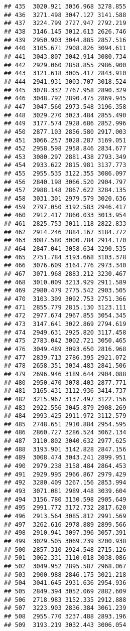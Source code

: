 \documentclass[
]{article}
\begin{document}
\begin{verbatim}
## 435  3020.921 3036.968 3278.855
## 436  3271.498 3047.127 3141.588
## 437  3224.799 2727.947 2792.219
## 438  3146.145 3012.613 2626.746
## 439  2950.903 3044.885 2857.516
## 440  3105.671 2908.826 3094.611
## 441  3043.807 3042.914 3080.734
## 442  2929.060 2858.855 2986.900
## 443  3121.618 3005.417 2843.910
## 444  2941.931 3003.707 3018.524
## 445  3078.332 2767.958 2890.329
## 446  3048.792 2890.475 2869.945
## 447  3047.560 2973.548 3196.358
## 448  3029.270 3023.484 2855.490
## 449  3177.574 2928.686 2852.996
## 450  2877.103 2856.580 2917.003
## 451  3066.257 3028.287 3169.051
## 452  2958.598 2958.846 2834.677
## 453  3080.297 2881.438 2793.349
## 454  2933.622 2815.981 3137.773
## 455  2955.535 3122.355 3086.097
## 456  2840.198 3066.520 2904.797
## 457  2988.148 2867.622 3284.135
## 458  3031.301 2979.579 3020.636
## 459  2797.050 3192.583 2946.417
## 460  2912.417 2860.033 3013.954
## 461  2825.753 3011.118 2822.833
## 462  2914.246 2884.167 3184.772
## 463  3087.580 3000.784 2914.170
## 464  2847.041 3058.634 3290.535
## 465  2751.784 3193.668 3103.378
## 466  3076.609 3164.776 2973.340
## 467  3071.968 2883.212 3230.467
## 468  3010.009 3213.929 2911.589
## 469  2980.479 2775.542 2903.505
## 470  3103.309 3092.753 2751.366
## 471  2855.779 2815.130 3123.111
## 472  2977.674 2967.855 3054.345
## 473  3147.641 3022.869 2794.619
## 474  2949.631 2925.820 3117.458
## 475  2783.042 3002.721 3050.465
## 476  3049.489 3093.650 2816.968
## 477  2839.713 2786.395 2921.072
## 478  2658.351 3034.483 2841.506
## 479  2696.946 3189.644 2904.088
## 480  2950.470 3078.403 2877.771
## 481  3165.431 3112.936 3414.737
## 482  3215.967 3137.497 3122.156
## 483  2922.556 3045.879 2908.269
## 484  2993.425 2911.972 3112.579
## 485  2748.651 2910.884 2954.595
## 486  2860.727 3286.524 3062.134
## 487  3110.802 3040.632 2977.625
## 488  3193.901 3142.828 2847.156
## 489  3008.474 3043.241 2899.951
## 490  2979.238 3158.484 2864.453
## 491  2929.995 2966.867 2979.429
## 492  3280.409 3267.156 2853.994
## 493  3071.081 2989.448 3039.604
## 494  3156.780 3130.598 2905.649
## 495  2991.772 3172.732 2817.620
## 496  2913.564 3085.812 2991.569
## 497  3262.616 2978.889 2899.566
## 498  2910.941 3097.396 3057.391
## 499  3029.505 3069.239 3200.938
## 500  2857.310 2924.548 2715.126
## 501  3062.331 3110.018 3038.086
## 502  3049.952 2895.587 2968.067
## 503  2900.988 2846.175 3021.218
## 504  3041.645 2931.636 2954.936
## 505  2849.394 3052.069 2882.609
## 506  2718.983 3152.335 2912.888
## 507  3223.903 2836.384 3061.239
## 508  2955.770 3237.488 2893.196
## 509  3193.219 3032.443 3006.054

\end{verbatim}
\end{document}
